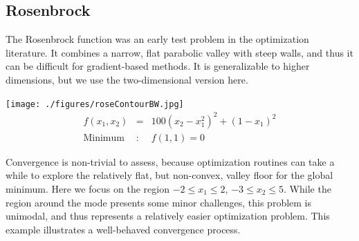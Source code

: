 \documentclass[12pt]{article}
\begin{document}
%
%
\subsection{Rosenbrock}
%
%

%
The Rosenbrock function \citep{rosePaper} was an early test problem in the optimization literature. 
%
It combines a narrow, flat parabolic valley with steep walls, and thus it can be difficult for gradient-based methods. It is generalizable to higher dimensions, but we use the two-dimensional version here.
%
\begin{center}
        \texttt{[image: ./figures/roseContourBW.jpg]}
        \begin{eqnarray}
        f(x_1, x_2) &=& 100\left(x_2-x_1^2\right)^2 + (1-x_1)^2 \\
        \text{Minimum}&:& f(1, 1)=0\nonumber
        \label{roseEq}
        \end{eqnarray}  
\end{center}
%
Convergence is non-trivial to assess, because optimization routines can take a while to explore the relatively flat, but non-convex, valley floor for the global minimum.  
%
Here we focus on the region $-2\le x_1\le2$, $-3\le x_2\le5$.  
%
While the region around the mode presents some minor challenges, this problem is unimodal, and thus represents a relatively easier optimization problem.  
%
This example illustrates a well-behaved convergence process.
\end{document}
